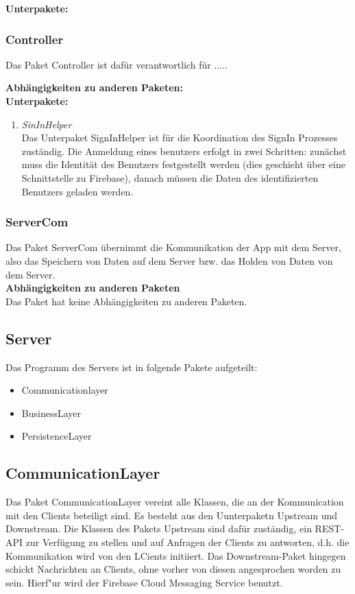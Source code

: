 \documentclass[11pt,a4paper]{report}
\begin{document}
\textbf{Unterpakete:}\\

\subsubsection{Controller}
Das Paket Controller ist dafür verantwortlich für .....

\textbf{Abhängigkeiten zu anderen Paketen:}\\


\textbf{Unterpakete:}\\
\begin{enumerate}
	\item \textit{SinInHelper}\\
	Das Unterpaket SignInHelper ist für die Koordination des SignIn Prozesses zuständig. Die Anmeldung eines benutzers erfolgt in zwei Schritten: zunächst muss die Identität des Benutzers festgestellt werden (dies geschieht über eine Schnittstelle zu Firebase), danach müssen die Daten des identifizierten Benutzers geladen werden.
\end{enumerate}

\subsubsection{ServerCom}
Das Paket ServerCom übernimmt die Kommunikation der App mit dem Server, also das Speichern von Daten auf dem Server bzw. das Holden von Daten von dem Server.\\

\textbf{Abhängigkeiten zu anderen Paketen}\\
Das Paket hat keine Abhängigkeiten zu anderen Paketen.

\subsection{Server}
Das Programm des Servers ist in folgende Pakete aufgeteilt:
\begin{itemize}
	\item Communicationlayer
	\item BusinessLayer
	\item PersistenceLayer
\end{itemize}

\subsection{CommunicationLayer}
Das Paket CommunicationLayer vereint alle Klassen, die an der Kommunication mit den Clients beteiligt sind. Es besteht aus den Uunterpaketn Upstream und Downstream. Die Klassen des Pakets Upstream sind dafür zuständig, ein REST-API zur Verfügung zu stellen und auf Anfragen der Clients zu antworten, d.h. die Kommunikation wird von den LCients initiiert. Das Downstream-Paket hingegen schickt Nachrichten an Clients, ohne vorher von diesen angesprochen worden zu sein. Hierf"ur wird der Firebase Cloud Messaging Service benutzt.
\end{document}
